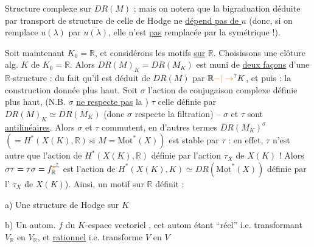 Structure  complexe sur $DR(M)$ ; mais on notera que
la bigraduation déduite par transport de structure
de celle de Hodge ne \uline{dépend pas de $u$}
(donc, si on remplace $u(\lambda)$ par $\overline{u(\lambda)}$, elle n'est \uline{pas}
remplacée par la symétrique !).


 Soit maintenant $K_0=\mathbb R$, et considérons les
motifs  \uline{sur} $\mathbb R$. Choisissons une clôture alg.
$K$ de $K_0=\mathbb R$. Alors $DR(M)_K=DR(M_K)$
est muni de \uline{deux façons} d'une $\mathbb R$-structure :
du fait qu'il est déduit de $DR(M)$ par $\mathbb R\unsure{-|\to}K$,
et puis : la construction donnée plus haut.
Soit $\sigma$ l'action de conjugaison complexe définie
plus haut, (N.B. $\sigma$ \uline{ne respecte pas} la )
$\tau$ celle définie par $DR(M)_K\simeq DR(M_K)$ (donc
$\sigma$ respecte la filtration) -- $\sigma$ et $\tau$ sont
\uline{antilinéaires}. Alors $\sigma$ et $\tau$ commutent,
en d'autres termes $DR(M_K)^\sigma$ $\left(=H^*(X(K),\mathbb R)\ \text{si }M=\mathrm{Mot}^*(X)\right)$
est stable par $\tau$ : en effet, $\tau$ n'est autre
que l'action de $H^*(X(K),\mathbb R)$ définie par
l'action $\tau_X$ de $X(K)$ ! Alors $\sigma\tau=\tau\sigma=f^{\deleted{\unsure{*}}}_{\mathbb R}$
est l'action de $H^*(X(K),K)\simeq DR(\mathrm{Mot}^*(X))$
définie par l'  $\tau_X$ de $X(K)$). Ainsi, un
motif sur $\mathbb R$ définit :

a) Une structure de Hodge  sur $K$

b) Un autom. $f$  du $K$-espace vectoriel ,
cet autom étant ``réel'' i.e.  transformant $V_{\mathbb R}$ en $V_{\mathbb R}$,
 et \unsure{$=$} \uline{rationnel} i.e. transforme $V$ en $V$

